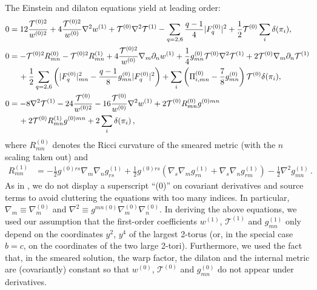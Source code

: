 \documentclass[11pt]{article}
\newcommand{\nl}{\notag \\ &\quad\,}
\renewcommand{\[}{\left[}
\renewcommand{\]}{\right]}
\renewcommand{\(}{\left(}
\renewcommand{\)}{\right)}
\newcommand{\<}{\langle}
\renewcommand{\>}{\rangle}
\begin{document}
The Einstein and dilaton equations yield at leading order:
\begin{align}
0 &= 12\frac{\mathcal{T}^{(0)2}}{w^{(0)2}} + 4 \frac{\mathcal{T}^{(0)2}}{w^{(0)}} \nabla^2 w^{(1)} + \mathcal{T}^{(0)} \nabla^2\mathcal{T}^{(1)}
-\sum_{q=2,6} \frac{q-1}{4}  |F_q^{(0)}|^2 + \frac{1}{2} \mathcal{T}^{(0)} \sum_i\delta(\pi_i), \label{loc4} \\
0 &= -\mathcal{T}^{(0)2} R^{(0)}_{mn} -\mathcal{T}^{(0)2} R^{(1)}_{mn} + 4\frac{\mathcal{T}^{(0)2}}{w^{(0)}} \nabla_m \partial_n w^{(1)} + \frac{1}{4} g_{mn}^{(0)} \mathcal{T}^{(0)} \nabla^2\mathcal{T}^{(1)} + 2 \mathcal{T}^{(0)} \nabla_m \partial_n \mathcal{T}^{(1)} \nl
+\frac{1}{2} \sum_{q=2,6} \left( |F^{(0)}_q|_{mn}^2-\frac{q-1}{8}g_{mn}^{(0)} |F^{(0)}_q|^2 \right) + \sum_i \left( \Pi^{(0)}_{i,mn}- \frac{7}{8}g^{(0)}_{mn}\right) \mathcal{T}^{(0)} \delta(\pi_i), \label{loc5} \\
0 &= - 8 \nabla^2 \mathcal{T}^{(1)}- 24\frac{\mathcal{T}^{(0)}}{w^{(0)2}} - 16 \frac{\mathcal{T}^{(0)}}{w^{(0)}} \nabla^2 w^{(1)} + 2\mathcal{T}^{(0)} R_{mn}^{(0)}g^{(0)mn}
\nl + 2\mathcal{T}^{(0)} R_{mn}^{(1)}g^{(0)mn} + 2\sum_i \delta(\pi_i)\,, \label{loc3}
\end{align}
where $R^{(0)}_{mn}$ denotes the Ricci curvature of the smeared metric (with the $n$ scaling taken out) and
\begin{align}
R^{(1)}_{mn} &= - \frac{1}{2} g^{(0)rs} \nabla_m \nabla_n g^{(1)}_{rs}+\frac{1}{2} g^{(0)rs} \left( \nabla_s \nabla_m g^{(1)}_{rn}+\nabla_s \nabla_n g^{(1)}_{rm}\right) -\frac{1}{2} \nabla^2 g_{mn}^{(1)}\,. \label{r}
\end{align}
As in \cite{Junghans:2020acz}, we do not display a superscript ``(0)'' on covariant derivatives and source terms to avoid cluttering the equations with too many indices. In particular, $\nabla_m\equiv\nabla_m^{(0)}$ and $\nabla^2\equiv g^{mn(0)}\nabla_m^{(0)}\nabla_n^{(0)}$.
In deriving the above equations, we used our assumption that the first-order coefficients $w^{(1)}$, $\mathcal{T}^{(1)}$ and $g_{mn}^{(1)}$ only depend on the coordinates $y^2$, $y^4$ of the largest 2-torus (or, in the special case $b=c$, on the coordinates of the two large 2-tori). Furthermore, we used the fact that, in the smeared solution, the warp factor, the dilaton and the internal metric are (covariantly) constant so that $w^{(0)}$, $\mathcal{T}^{(0)}$ and $g_{mn}^{(0)}$ do not appear under derivatives.
\end{document}
